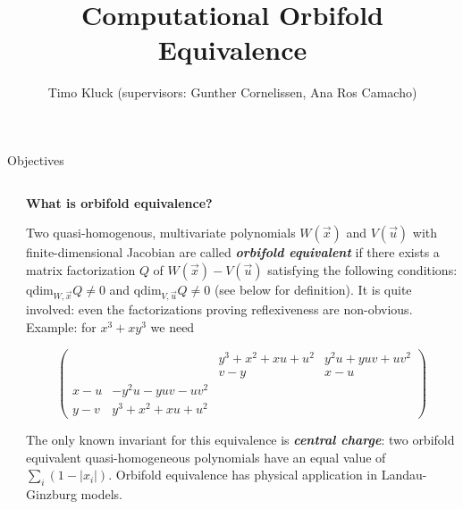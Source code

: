 \documentclass[final]{beamer}
\title{Computational Orbifold Equivalence} %
\author{Timo Kluck (supervisors: Gunther Cornelissen, Ana Ros Camacho)} %
\institute{Utrecht University} %
\newlength{\sepwid}
\newlength{\smallercolwid}
\begin{document}

\setlength{\belowcaptionskip}{2ex} %
\setlength\belowdisplayshortskip{2ex} %

\begin{frame}[t] %

\begin{alertblock}{Objectives}

\begin{columns}

\begin{column}{\sepwid}\end{column} %

\begin{column}{\smallercolwid} %

\justify

\textbf{\large{}What is orbifold equivalence?}{\large \par}

Two quasi-homogenous, multivariate polynomials $W(\vec{x})$
and $V(\vec{u})$ with finite-dimensional Jacobian are called \textbf{\emph{orbifold equivalent}} \cite{carqueville2016orbifold} if there
exists a matrix factorization $Q$ of $W(\vec{x})-V(\vec{u})$
satisfying the following conditions: $\mathrm{qdim}_{W,\vec{x}}Q\neq0$
and $\mathrm{qdim}_{V,\vec{u}}Q\neq0$ (see below for definition).
It is quite involved: even the factorizations proving reflexiveness
are non-obvious. Example: for $x^{3}+xy^{3}$ we need

\[
\left(\begin{array}{cccc}
 &  & y^{3}+x^{2}+xu+u^{2} & y^{2}u+yuv+uv^{2}\\
 &  & v-y & x-u\\
x-u & -y^{2}u-yuv-uv^{2}\\
y-v & y^{3}+x^{2}+xu+u^{2}
\end{array}\right)
\]

The only known invariant for this equivalence is \textbf{\emph{central
charge}}: two orbifold equivalent quasi-homogeneous polynomials have an
equal value of $\sum_{i}(1 - |x_i|)$.
Orbifold equivalence has physical application in Landau-Ginzburg models.

\bigskip


\end{column}
\end{columns}
\end{alertblock}
\end{frame}
\end{document}
